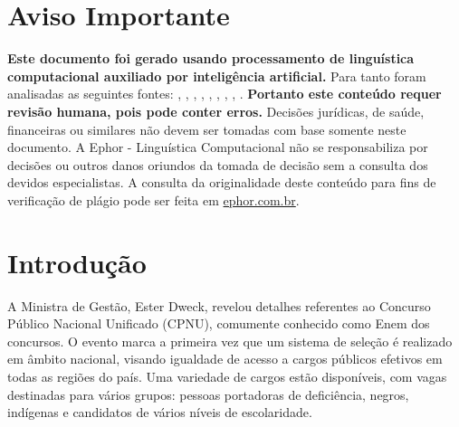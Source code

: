 \documentclass[
   article,       
   12pt,          
   oneside,       
   a4paper,       
   english,       
   brazil,        
   sumario=tradicional
   ]{abntex2}
\begin{document}
\frenchspacing 
\maketitle

\textual
\section{Aviso Importante}
\textbf{Este documento foi gerado usando processamento de linguística computacional auxiliado por inteligência artificial.} Para tanto foram analisadas as seguintes fontes:  \cite{Concurso_Nacional_Unificado_edital_e_retifica}, \cite{Concurso_unificado_a_novidade_do_momentozdbxl}, \cite{Concurso_Unificado_Divulgadas_novas_retificac}, \cite{Enem_dos_Concursos_cerca_de_2_mil_vagas_serao}, \cite{Enem_dos_Concursos_quando_comeca_quanto_custa}, \cite{Enem_dos_concursos_tem_vagas_para_o_Tocantins}, \cite{Inscricoes_para_Enem_dos_Concursos_comecam_ne}, \cite{ldquoEnem_dos_Concursosrdquo_recebe_mais_de_7}, \cite{Saiba_como_vai_funcionar_o_Enem_dos_concursos}.
\textbf{Portanto este conteúdo requer revisão humana, pois pode conter erros.} Decisões jurídicas, de saúde, financeiras ou similares não devem ser tomadas com base somente neste documento. A Ephor - Linguística Computacional não se responsabiliza por decisões ou outros danos oriundos da tomada de decisão sem a consulta dos devidos especialistas.
A consulta da originalidade deste conteúdo para fins de verificação de plágio pode ser feita em \href{http://www.ephor.com.br}{ephor.com.br}.
\section {Introdução}A Ministra de Gestão, Ester Dweck, revelou detalhes referentes ao Concurso Público Nacional Unificado (CPNU), comumente conhecido como \textquotedbl{}Enem dos concursos\textquotedbl{}. O evento marca a primeira vez que um sistema de seleção é realizado em âmbito nacional, visando igualdade de acesso a cargos públicos efetivos em todas as regiões do país. Uma variedade de cargos estão disponíveis, com vagas destinadas para vários grupos: pessoas portadoras de deficiência, negros, indígenas e candidatos de vários níveis de escolaridade.
\end{document}
